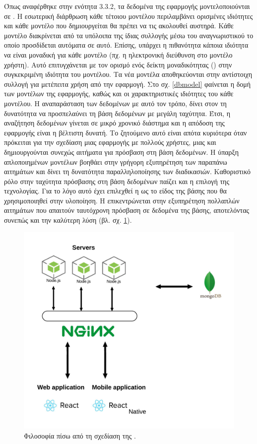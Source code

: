 Όπως αναφέρθηκε στην ενότητα 3.3.2, τα δεδομένα της εφαρμογής μοντελοποιούνται σε . Η εσωτερική διάρθρωση κάθε τέτοιου μοντέλου περιλαμβάνει ορισμένες ιδιότητες και κάθε μοντέλο που δημιουργείται θα πρέπει να τις ακολουθεί αυστηρά. Κάθε μοντέλο διακρίνεται από τα υπόλοιπα της ίδιας συλλογής μέσω του αναγνωριστικού  το οποίο προσδίδεται αυτόματα σε αυτό. Επίσης, υπάρχει η πιθανότητα κάποια ιδιότητα να είναι μοναδική για κάθε μοντέλο (πχ. η ηλεκτρονική διεύθυνση στο μοντέλο χρήστη). Αυτό επιτυγχάνεται με τον ορισμό ενός δείκτη μοναδικότητας () στην συγκεκριμένη ιδιότητα του μοντέλου. Τα νέα μοντέλα αποθηκεύονται στην αντίστοιχη συλλογή για μετέπειτα χρήση από την εφαρμογή. Στο σχ. \ref{dbmodel} φαίνεται η δομή των μοντέλων της εφαρμογής, καθώς και οι χαρακτηριστικές ιδιότητες του κάθε μοντέλου. 
\newline
\indent
Η αναπαράσταση των δεδομένων με αυτό τον τρόπο, δίνει στον  τη δυνατότητα να προσπελαύνει τη βάση δεδομένων με μεγάλη ταχύτητα. Έτσι, η αναζήτηση δεδομένων γίνεται σε μικρό χρονικό διάστημα και η απόδοση της εφαρμογής είναι η βέλτιστη δυνατή. Το ζητούμενο αυτό είναι απότα κυριότερα όταν πρόκειται για την σχεδίαση μιας εφαρμογής με πολλούς χρήστες, μιας και δημιουργούνται συνεχώς αιτήματα για πρόσβαση στη βάση δεδομένων. Η ύπαρξη απλοποιημένων μοντέλων βοηθάει στην γρήγορη εξυπηρέτηση των παραπάνω αιτημάτων και δίνει τη δυνατότητα παραλληλοποίησης των διαδικασιών.
\newline
\indent
Καθοριστικό ρόλο στην ταχύτητα πρόσβασης στη βάση δεδομένων παίζει και η επιλογή της τεχνολογίας. Για το λόγο αυτό έχει επιλεχθεί η  ως το είδος της βάσης που θα χρησιμοποιηθεί στην υλοποίηση. Η  επικεντρώνεται στην εξυπηρέτηση πολλαπλών αιτημάτων που απαιτούν ταυτόχρονη πρόσβαση σε δεδομένα της βάσης, αποτελόντας συνεπώς και την καλύτερη λύση (βλ. σχ. \ref{mondodb}).

\begin{figure}[H]
    \centering
    \includegraphics[scale=0.5]{figures/mongoDB-strucure.png}
    \caption{Φιλοσοφία πίσω από τη σχεδίαση της .}
    \label{mondodb}
\end{figure}


